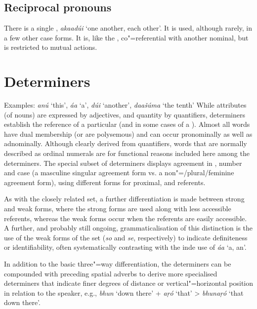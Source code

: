 \subsection{Reciprocal pronouns}
\label{subsec:3b-6-5}
There is a single , \textit{akaadúi} `one another, each other'. It is used, although rarely, in a few other case forms. It is, like the , co"=referential with another nominal, but is restricted to mutual actions.


\section{Determiners}
\label{sec:3b-7}
Examples: \textit{anú} `this', \textit{áa} `a', \textit{dúi} `another', \textit{daašúma} `the tenth'
While attributes (of nouns) are expressed by adjectives, and quantity by quantifiers, determiners establish the reference of a particular  (and in some cases of a ). Almost all  words have dual membership (or are polysemous) and can occur pronominally as well as adnominally. Although clearly derived from quantifiers, words that are normally described as ordinal numerals are for functional reasons included here among the determiners. The special subset of  determiners displays agreement in , number and case (a  masculine singular agreement form vs. a non"=/plural/feminine agreement form), using different forms for proximal,  and  referents.


As with the closely related   set, a further differentiation is made between strong and weak forms, where the strong forms are used along with less accessible  referents, whereas the weak forms occur when the referents are easily accessible. A further, and probably still ongoing, grammaticalisation of this distinction is the use of the weak forms of the  set (\textit{so} and \textit{se}, respectively) to indicate definiteness or identifiability, often systematically contrasting with the inde use of \textit{áa} `a, an'.


In addition to the basic three"=way differentiation, the  determiners can be compounded with preceding spatial adverbs to derive more specialised determiners that  indicate finer degrees of distance or vertical"=horizontal position in relation to the speaker, e.g., \textit{bhun} `down there' + \textit{aṛó} `that' > \textit{bhunaṛó} `that down there'.


